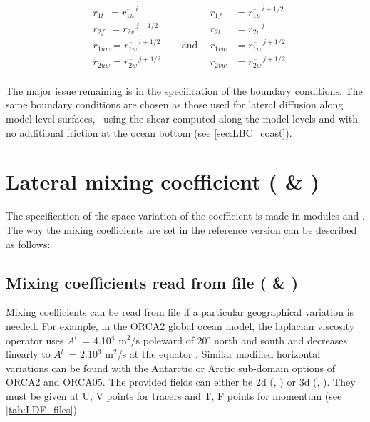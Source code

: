\documentclass[../main/NEMO_manual]{subfiles}
\begin{document}
\[
  \begin{aligned}
    &r_{1t}\ \ = \overline{r_{1u}}^{\,i}       &&&    r_{1f}\ \ &= \overline{r_{1u}}^{\,i+1/2} \\
    &r_{2f} \ \ = \overline{r_{2v}}^{\,j+1/2} &&& 	r_{2t}\ &= \overline{r_{2v}}^{\,j} \\
    &r_{1uw}  = \overline{r_{1w}}^{\,i+1/2} &&\ \ \text{and} \ \ &   r_{1vw}&= \overline{r_{1w}}^{\,j+1/2} \\
    &r_{2uw}= \overline{r_{2w}}^{\,j+1/2} &&&         r_{2vw}&= \overline{r_{2w}}^{\,j+1/2}\\
  \end{aligned}
\]

The major issue remaining is in the specification of the boundary conditions.
The same boundary conditions are chosen as those used for lateral diffusion along model level surfaces,
\ie\ using the shear computed along the model levels and with no additional friction at the ocean bottom
(see \autoref{sec:LBC_coast}).

\section[Lateral mixing coefficient (\forcode{nn_aht_ijk_t} \& \forcode{nn_ahm_ijk_t})]{Lateral mixing coefficient (\protect{} \& \protect{})}
\label{sec:LDF_coef}

The specification of the space variation of the coefficient is made in modules  and .
The way the mixing coefficients are set in the reference version can be described as follows:

\subsection[Mixing coefficients read from file (\forcode{=-20, -30})]{ Mixing coefficients read from file (\protect{} \& \protect{})}

Mixing coefficients can be read from file if a particular geographical variation is needed. For example, in the ORCA2 global ocean model,
the laplacian viscosity operator uses $A^l$~= 4.10$^4$ m$^2$/s poleward of 20$^{\circ}$ north and south and
decreases linearly to $A^l$~= 2.10$^3$ m$^2$/s at the equator \citep{madec.delecluse.ea_JPO96, delecluse.madec_icol99}.
Similar modified horizontal variations can be found with the Antarctic or Arctic sub-domain options of ORCA2 and ORCA05.
The provided fields can either be 2d (, ) or 3d (,  ). They must be given at U, V points for tracers and T, F points for momentum (see \autoref{tab:LDF_files}).
\end{document}

